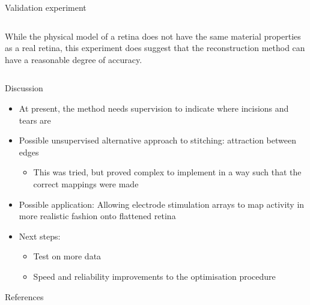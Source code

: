 \documentclass[final,hyperref={pdfpagelabels=false}]{beamer}
\begin{document}
\begin{frame}{}
\begin{columns}[T]
\begin{column}{.33\linewidth}
\begin{block}{Validation experiment}
\begin{columns}
\begin{column}{0.23\linewidth}
          While the physical model of a retina does not have the same
          material properties as a real retina, this experiment does
          suggest that the reconstruction method can have a reasonable
          degree of accuracy.
          \end{column}
        \end{columns}
      \end{block}

      \begin{block}{Discussion}
        \begin{itemize}
        \item At present, the method needs supervision to indicate
          where incisions and tears are
        \item Possible unsupervised alternative approach to stitching:
          attraction between edges
          \begin{itemize}
          \item This was tried, but proved complex to implement in a
            way such that the correct mappings were made
          \end{itemize}
        \item Possible application: Allowing electrode stimulation
          arrays to map activity in more realistic fashion onto
          flattened retina
        \item Next steps:
          \begin{itemize}
          \item Test on more data
          \item Speed and reliability improvements to the optimisation
            procedure
          \end{itemize}
        \end{itemize}
      \end{block}

      \begin{block}{\large References}
        \small
        
        
      \end{block}
    \end{column}


  \end{columns}



\end{frame}
\end{document}

